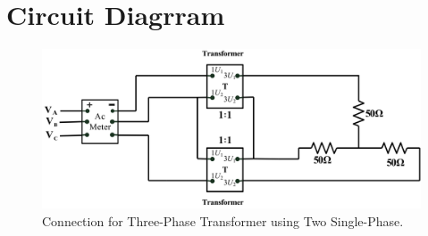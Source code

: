 \documentclass[a4paper,12pt]{article}
\begin{document}
	\section{Circuit Diagrram}
	
	
	\begin{figure}[H]
	
	
			\centering
			\includegraphics[width=1\linewidth]{Images/exp10}
			\caption{Connection for Three-Phase Transformer using Two Single-Phase.}
		
		
	\end{figure}
	
	
	\newpage
	
	
\end{document}
